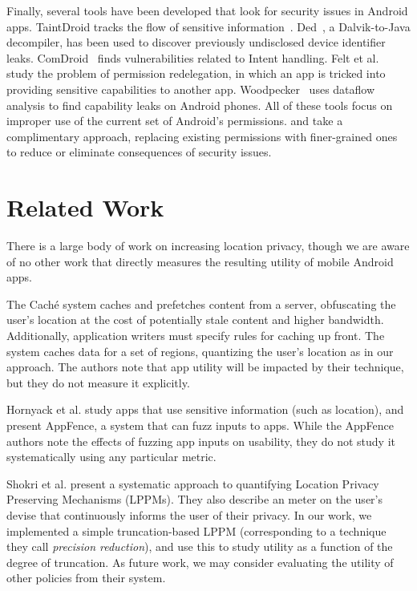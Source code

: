 Finally, several tools have been developed that look for security
issues in Android apps. TaintDroid tracks the flow of sensitive
information~\cite{taintdroid}. Ded~\cite{ded}, a Dalvik-to-Java
decompiler, has been used to discover previously undisclosed device
identifier leaks. ComDroid~\cite{chin11:mobisys} finds vulnerabilities
related to Intent handling. Felt et al.~\cite{felt2011permission}
study the problem of permission redelegation, in which an app is
tricked into providing sensitive capabilities to another app.
Woodpecker~\cite{grace:ndss12} uses dataflow analysis to find
capability leaks on Android phones. All of these tools focus on
improper use of the current set of Android's permissions. \rewriter
and \lib take a complimentary approach, replacing existing permissions
with finer-grained ones to reduce or eliminate consequences of
security issues.


\section{Related Work}

There is a large body of work on increasing location
privacy, though we are aware of no other work that directly measures
the resulting utility of mobile Android apps.

The Cach\'{e} system \cite{Amini:2010} caches and prefetches
content from a server, obfuscating the user's location at the cost of
potentially stale content and higher bandwidth.  Additionally,
application writers must specify rules for caching up front.  The
system caches data for a set of regions, quantizing the user's location 
as in our approach.  
The authors note that app utility will be impacted by their technique, 
but they do not measure it explicitly.

Hornyack et al. \cite{Hornyack:2011} study apps that use sensitive
information (such as location), and present AppFence, a system that
can fuzz inputs to apps. While the AppFence authors note the effects of
fuzzing app inputs on usability, they do not study it systematically
using any particular metric.

Shokri et al. \cite{Shokri:2011} present a systematic approach to
quantifying Location Privacy Preserving Mechanisms (LPPMs).  They also
describe an meter on the user's devise that
continuously informs the user of their privacy.  In our work, we implemented a simple
truncation-based LPPM (corresponding to a technique they call
\emph{precision reduction}), and use this to study
utility as a function of the degree of truncation. As future work, we
may consider evaluating the utility of other policies from their
system.

